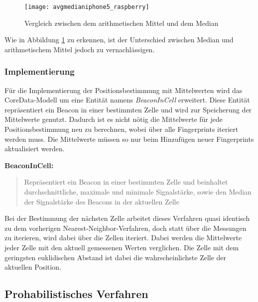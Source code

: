 \begin{figure}[htb!]
		\centering
	\texttt{[image: avgmedianiphone5\_raspberry]}
	\caption{Vergleich zwischen dem arithmetischen Mittel und dem Median}
	\label{avgmedianiphone5_raspberry}
\end{figure}

Wie in Abbildung \ref{avgmedianiphone5_raspberry} zu erkennen, ist der Unterschied zwischen Median und arithmetischem Mittel jedoch zu vernachlässigen. 

\subsubsection{Implementierung}
\label{sec:implementation:fingerprinting:positioning:avg:implementiation}
Für die Implementierung der Positionsbestimmung mit Mittelwerten wird das CoreData-Modell um eine Entität namens \emph{BeaconInCell} erweitert. Diese Entität repräsentiert ein Beacon in einer bestimmten Zelle und wird zur Speicherung der Mittelwerte genutzt. Dadurch ist es nicht nötig die Mittelwerte für jede Positionsbestimmung neu zu berechnen, wobei über alle Fingerprints iteriert werden muss. Die Mittelwerte müssen so nur beim Hinzufügen neuer Fingerprints aktualisiert werden.

\textbf{BeaconInCell:}
	\begin{quote}Repräsentiert ein Beacon in einer bestimmten Zelle und beinhaltet durchschnittliche, maximale und minimale Signalstärke, sowie den Median der Signalstärke des Beacons in der aktuellen Zelle\end{quote}

Bei der Bestimmung der nächsten Zelle arbeitet dieses Verfahren quasi identisch zu dem vorherigen Nearest-Neighbor-Verfahren, doch statt über die Messungen zu iterieren, wird dabei über die Zellen iteriert. Dabei werden die Mittelwerte jeder Zelle mit den aktuell gemessenen Werten verglichen. Die Zelle mit dem geringsten euklidischen Abstand ist dabei die wahrscheinlichste Zelle der aktuellen Position.

\subsection{Prohabilistisches Verfahren}
\label{sec:implementation:fingerprinting:positioning:probability}

